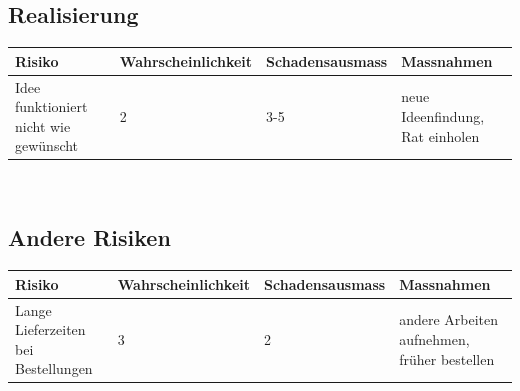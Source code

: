 \subsection{Realisierung}
\begin{table}[h]
\begin{tabular}{|p{3cm}|p{3cm}|p{3cm}|p{4cm}|}\hline
	
	\textbf{Risiko}	& 	\textbf{Wahrscheinlichkeit} & \textbf{Schadensausmass}  & \textbf{Massnahmen} \\\hline
	
	Idee funktioniert nicht wie gewünscht	&	2	&	3-5	& neue Ideenfindung, Rat einholen  \\\hline
\end{tabular}\\
\end{table}

\subsection{Andere Risiken}
\begin{table}[h]
\begin{tabular}{|p{3cm}|p{3cm}|p{3cm}|p{4cm}|}\hline
	
	\textbf{Risiko}	& 	\textbf{Wahrscheinlichkeit} & \textbf{Schadensausmass}  & \textbf{Massnahmen} \\\hline
	
	Lange Lieferzeiten bei Bestellungen	&	3	&	2	& andere Arbeiten aufnehmen, früher bestellen  \\\hline
\end{tabular}\\
\end{table}

